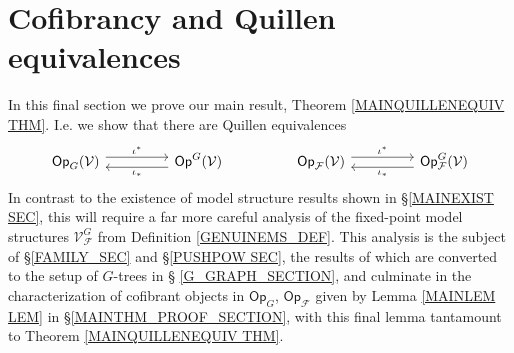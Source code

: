 \documentclass[a4paper,10pt
,draft
]{article}%
\numberwithin{equation}{section}
\numberwithin{figure}{section}
\theoremstyle{definition} %
\newtheorem{definition}[equation]{Definition}%
\newcommand{\sets}[2]{\left\{ #1 \;|\; #2\right\}}%
\newcommand{\Sym}{\ensuremath{\mathsf{Sym}}}%
\newcommand{\Op}{\mathsf{Op}}%
\newcommand{\F}{\ensuremath{\mathcal F}}
\newcommand{\V}{\ensuremath{\mathcal V}}
\renewcommand{\P}{\ensuremath{\mathcal P}}
\newcommand{\1}{\ensuremath{\mathbbm 1}}%
\begin{document}









\section{Cofibrancy and Quillen equivalences}\label{COFIB SEC}

In this final section we prove our main result, Theorem \ref{MAINQUILLENEQUIV THM}. I.e. we show 
that there are Quillen equivalences
\[
\begin{tikzcd}[column sep =4.5em]
	\mathsf{Op}_{G}(\mathcal{V}) 
	\arrow[r, shift left=1.5,swap,"\iota^{\**}"']
&
	\mathsf{Op}^G(\mathcal{V})
	\ar[shift left=1.5]{l}{\iota_{\**}}
&
	\mathsf{Op}_{\mathcal{F}}(\mathcal{V}) 
	\arrow[r, shift left=1.5,swap,"\iota^{\**}"']
&
	\mathsf{Op}^G_{\mathcal{F}}(\mathcal{V})
	\ar[shift left=1.5]{l}{\iota_{\**}}
\end{tikzcd}
\]
In contrast to the existence of model structure results shown in \S \ref{MAINEXIST SEC},
this will require a far more careful analysis of the  
fixed-point model structures
$\mathcal{V}^G_{\mathcal{F}}$
from Definition \ref{GENUINEMS_DEF}.
%
This analysis is the subject of \S \ref{FAMILY_SEC} and \S \ref{PUSHPOW SEC}, the results of which are converted 
to the setup of $G$-trees in \S
\ref{G_GRAPH_SECTION},
and culminate in 
the characterization of cofibrant objects in
$\mathsf{Op}_{G}$,
$\mathsf{Op}_{\mathcal{F}}$ given by
Lemma \ref{MAINLEM LEM}
in \S \ref{MAINTHM_PROOF_SECTION},
with this final lemma tantamount to 
Theorem \ref{MAINQUILLENEQUIV THM}.
\end{document}
